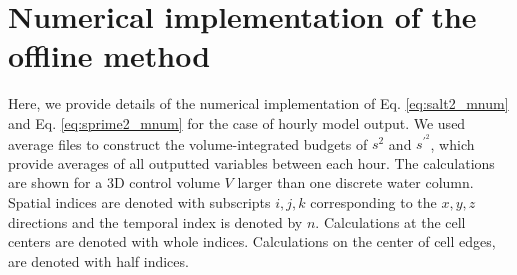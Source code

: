\documentclass[draft]{agujournal2019}
\begin{document}
%
%



\appendix
\section{Numerical implementation of the offline method} \label{Appendix:offline_method}

Here, we provide details of the numerical implementation of Eq. \ref{eq:salt2_mnum} and Eq. \ref{eq:sprime2_mnum} for the case of hourly model output. We used average files to construct the volume-integrated budgets of $s^2$ and $s^{\prime^2}$, which provide averages of all outputted variables between each hour. The calculations are shown for a 3D control volume $V$ larger than one discrete water column. Spatial indices are denoted with subscripts $i,j,k$ corresponding to the $x,y,z$ directions and the temporal index is denoted by $n$. Calculations at the cell centers are denoted with whole indices. Calculations on the center of cell edges, are denoted with half indices. 
\end{document}
